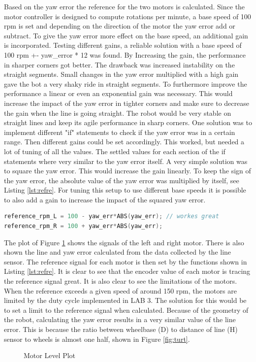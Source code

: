 \documentclass[english]{article}
\begin{document}
Based on the yaw error the reference for the two motors is calculated.
Since the motor controller is designed to compute rotations per minute, a base speed of 100 rpm is set and depending on the direction of the motor the yaw error add or subtract. To give the yaw error more effect on the base speed, an additional gain is incorporated. Testing different gains, a reliable solution with
a base speed of 100 rpm +- yaw\_error * 12 was found. By Increasing the gain, the performance in sharper corners got better. The drawback was increased instability
 on the straight segments. Small changes in the yaw error multiplied with 
 a high gain gave the bot a very shaky ride in straight segments. To furthermore 
 improve the performance a linear or even an exponential gain was necessary. 
 This would increase the impact of the yaw error in tighter corners and make 
 sure to decrease the gain when the line is going straight. The robot would 
 be very stable on straight lines and keep its agile performance in sharp corners. 
 One solution was to implement different "if" statements to check if the yaw error was in
  a certain range. Then different gains could be set accordingly. This worked, 
  but needed a lot of tuning of all the values. The settled values for each section of the if statements where very similar to the yaw error itself.   
 A very simple solution was to square the yaw error.
  This would increase the gain linearly. To keep the
   sign of the yaw error, the absolute value of the yaw 
   error was multiplied by itself, see Listing \ref{lst:refre}. For tuning
    this setup to use different base speeds it is possible to
     also add a gain to increase the impact of the squared yaw error.   
\begin{lstlisting}[language=C, caption={Calculating the reference signals for the motors}, label={lst:refre} ]
reference_rpm_L = 100 - yaw_err*ABS(yaw_err); // workes great 
reference_rpm_R = 100 + yaw_err*ABS(yaw_err);
\end{lstlisting}
\newpage
The plot of Figure \ref{fig:datal4} shows the signals of the left and right motor. There is also 
shown the line and yaw error calculated from the data collected by the line sensor.
The reference signal for each motor is then set by the functions shown in Listing \ref{lst:refre}.
It is clear to see that the encoder value of each motor is tracing the reference 
signal great. It is also clear to see the limitations of the motors. When the
reference exceeds a given speed of around 150 rpm, the motors are limited by the 
duty cycle implemented in LAB 3. The solution for this would be to set a limit to
the reference signal when calculated. Because of the geometry of the robot,
calculating the yaw error results in a very similar value of the line error.
This is because the ratio between wheelbase (D) to distance of line (H) sensor 
to wheels is almost one half, shown in Figure \ref{fig:turt}. 
\begin{figure}[tbh]
    \centering
    
    \caption{Motor Level Plot}
    \label{fig:datal4}
\end{figure}
\end{document}

